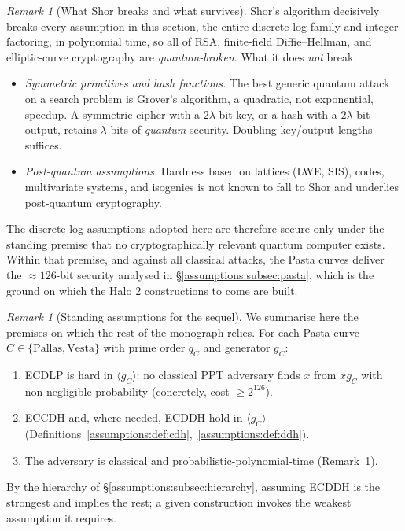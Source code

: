 \documentclass[11pt,a4paper]{article}
\theoremstyle{definition}
\theoremstyle{remark}
\newtheorem{remark}[theorem]{Remark}
\begin{document}
\begin{remark}[What Shor breaks and what survives]
\label{assumptions:rem:shor-scope}
Shor's algorithm decisively breaks every assumption in this section, the entire discrete-log family and integer factoring, in polynomial time, so all of RSA, finite-field Diffie--Hellman, and elliptic-curve cryptography are \emph{quantum-broken}. What it does \emph{not} break:
\begin{itemize}
\item \emph{Symmetric primitives and hash functions.} The best generic quantum attack on a search problem is Grover's algorithm, a quadratic, not exponential, speedup. A symmetric cipher with a \(2\lambda\)-bit key, or a hash with a \(2\lambda\)-bit output, retains \(\lambda\) bits of \emph{quantum} security. Doubling key/output lengths suffices.
\item \emph{Post-quantum assumptions.} Hardness based on lattices (LWE, SIS), codes, multivariate systems, and isogenies is not known to fall to Shor and underlies post-quantum cryptography.
\end{itemize}
The discrete-log assumptions adopted here are therefore secure only under the standing premise that no cryptographically relevant quantum computer exists. Within that premise, and against all classical attacks, the Pasta curves deliver the \(\approx 126\)-bit security analysed in \S\ref{assumptions:subsec:pasta}, which is the ground on which the Halo 2 constructions to come are built.
\end{remark}

\begin{remark}[Standing assumptions for the sequel]
\label{assumptions:rem:standing}
We summarise here the premises on which the rest of the monograph relies. For each Pasta curve \(C \in \{\mathrm{Pallas},\mathrm{Vesta}\}\) with prime order \(q_C\) and generator \(g_C\):
\begin{enumerate}
\item ECDLP is hard in \(\langle g_C\rangle\): no classical PPT adversary finds \(x\) from \(xg_C\) with non-negligible probability (concretely, cost \(\ge 2^{126}\)).
\item ECCDH and, where needed, ECDDH hold in \(\langle g_C\rangle\) (Definitions~\ref{assumptions:def:cdh},~\ref{assumptions:def:ddh}).
\item The adversary is classical and probabilistic-polynomial-time (Remark~\ref{assumptions:rem:shor-scope}).
\end{enumerate}
By the hierarchy of \S\ref{assumptions:subsec:hierarchy}, assuming ECDDH is the strongest and implies the rest; a given construction invokes the weakest assumption it requires.
\end{remark}
\end{document}
